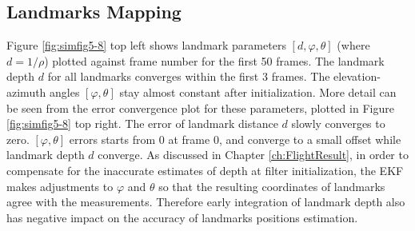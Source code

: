 \subsection{Landmarks Mapping}
Figure \ref{fig:simfig5-8} top left shows landmark parameters $[d,
\varphi ,\theta]$ (where $d=1/\rho $) plotted against frame number for
the first 50 frames. The landmark depth $d$ for all landmarks
converges within the first 3 frames. The elevation-azimuth angles
$[\varphi ,\theta]$ stay almost constant after initialization. More
detail can be seen from the error convergence plot for these
parameters, plotted in Figure \ref{fig:simfig5-8} top right. The error
of landmark distance $d$ slowly converges to zero. $[\varphi ,\theta]$
errors starts from 0 at frame 0, and converge to a small offset
while landmark depth $d$ converge. As discussed in Chapter
\ref{ch:FlightResult}, in order to compensate for the inaccurate
estimates of depth at filter initialization, the EKF makes adjustments
to $\varphi$ and $\theta$ so that the resulting coordinates of
landmarks agree with the measurements. Therefore early integration of
landmark depth also has negative impact on the accuracy of landmarks
positions estimation.

